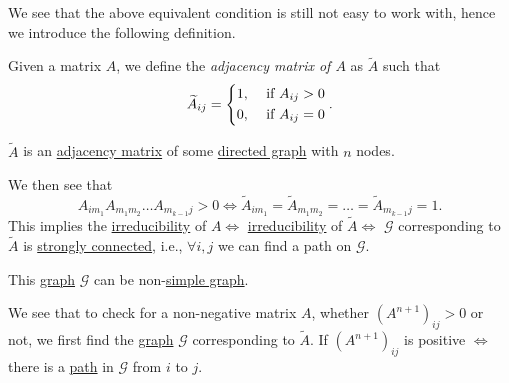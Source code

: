 We see that the above equivalent condition is still not easy to work with, hence we introduce the following definition.

\begin{definition}\label{def:adjacency-matrix-of-a-matrix}
	Given a matrix \(A\), we define the \emph{adjacency matrix of \(A\)} as \(\widetilde{A} \) such that
	\[
		\widetilde{A}_{ij} = \begin{dcases}
			1, & \text{ if }A_{ij}>0 \\
			0, & \text{ if }A_{ij}=0 \\
		\end{dcases}.
	\]
\end{definition}

\begin{note}
	\(\widetilde{A} \) is an \hyperref[def:adjacency-matrix]{adjacency matrix} of some \hyperref[def:directed-graph]{directed graph} with \(n\) nodes.
\end{note}

We then see that
\[
	A_{im_1} A_{m_1 m_2}\dots A_{m_{k-1} j} > 0 \iff \widetilde{A}_{im_1} = \widetilde{A}_{m_1 m_2} = \dots = \widetilde{A}_{m_{k-1}j} = 1.
\]
This implies the \hyperref[def:irreducible]{irreducibility} of \(A \iff\) \hyperref[def:irreducible]{irreducibility} of \(\widetilde{A}\iff\) \(\mathcal{G}\) corresponding to \(\widetilde{A}\) is \hyperref[def:strongly-connected]{strongly connected}, i.e., \(\forall  i, j\) we can find a path on \(\mathcal{G}\).
\begin{remark}
	This \hyperref[def:graph]{graph} \(\mathcal{G}\) can be non-\hyperref[def:simple-graph]{simple graph}.
\end{remark}

We see that to check for a non-negative matrix \(A\), whether \((A^{n+1})_{ij} > 0\) or not, we first find the \hyperref[def:graph]{graph} \(\mathcal{G} \) corresponding to \(\widetilde{A}\). If \((A^{n+1})_{ij}\) is positive \(\iff\) there is a \hyperref[def:path]{path} in \(\mathcal{G}\) from \(i\) to \(j\).